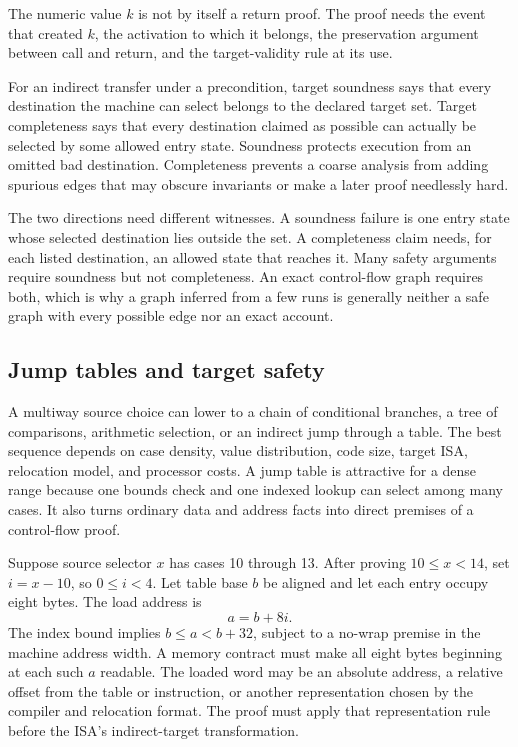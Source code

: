 \begin{keyidea}[title={A continuation is an address with provenance}]
The numeric value \(k\) is not by itself a return proof. The proof needs the
event that created \(k\), the activation to which it belongs, the preservation
argument between call and return, and the target-validity rule at its use.
\end{keyidea}

\begin{definition}[title={Target soundness and target completeness}]
For an indirect transfer under a precondition, target soundness says that every
destination the machine can select belongs to the declared target set. Target
completeness says that every destination claimed as possible can actually be
selected by some allowed entry state. Soundness protects execution from an
omitted bad destination. Completeness prevents a coarse analysis from adding
spurious edges that may obscure invariants or make a later proof needlessly
hard.
\end{definition}

The two directions need different witnesses. A soundness failure is one entry
state whose selected destination lies outside the set. A completeness claim
needs, for each listed destination, an allowed state that reaches it. Many
safety arguments require soundness but not completeness. An exact
control-flow graph requires both, which is why a graph inferred from a few
runs is generally neither a safe graph with every possible edge nor an exact
account.

\subsection{Jump tables and target safety}

A multiway source choice can lower to a chain of conditional branches, a tree
of comparisons, arithmetic selection, or an indirect jump through a table.
The best sequence depends on case density, value distribution, code size,
target ISA, relocation model, and processor costs. A jump table is attractive
for a dense range because one bounds check and one indexed lookup can select
among many cases. It also turns ordinary data and address facts into direct
premises of a control-flow proof.

Suppose source selector \(x\) has cases 10 through 13. After proving
\(10\le x<14\), set \(i=x-10\), so \(0\le i<4\). Let table base \(b\) be
aligned and let each entry occupy eight bytes. The load address is
\[
  a=b+8i.
\]
The index bound implies \(b\le a<b+32\), subject to a no-wrap premise in the
machine address width. A memory contract must make all eight bytes beginning
at each such \(a\) readable. The loaded word may be an absolute address, a
relative offset from the table or instruction, or another representation
chosen by the compiler and relocation format. The proof must apply that
representation rule before the ISA's indirect-target transformation.

